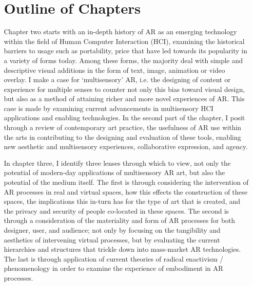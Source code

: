 \section{Outline of Chapters}\label{sec: introduction-outline}
Chapter two starts with an in-depth history of AR as an emerging technology within the field of Human Computer Interaction (HCI), examining the historical barriers to usage such as portability, price that have led towards its popularity in a variety of forms today. Among these forms, the majority deal with simple and descriptive visual additions in the form of text, image, animation or video overlay. I make a case for `multisensory' AR, i.e. the designing of content or experience for multiple senses to counter not only this bias toward visual design, but also as a method of attaining richer and more novel experiences of AR. This case is made by examining current advancements in multisensory HCI applications and enabling technologies. In the second part of the chapter, I posit through a review of contemporary art practice, the usefulness of AR use within the arts in contributing to the designing and evaluation of these tools, enabling new aesthetic and multisensory experiences, collaborative expression, and agency.

In chapter three, I identify three lenses through which to view, not only the potential of modern-day applications of multisensory AR art, but also the potential of the medium itself. The first is through considering the intervention of AR processes in real and virtual spaces, how this effects the construction of these spaces, the implications this in-turn has for the type of art that is created, and the privacy and security of people co-located in these spaces. The second is through a consideration of the materiality and form of AR processes for both designer, user, and audience; not only by focusing on the tangibility and aesthetics of intervening virtual processes, but by evaluating the current hierarchies and structures that trickle down into mass-market AR technologies. The last is through application of current theories of radical enactivism / phenomenology in order to examine the experience of embodiment in AR processes.

